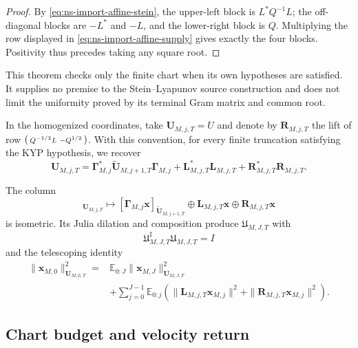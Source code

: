 \begin{proof}
By \eqref{eq:ns-import-affine-stein}, the upper-left block is \(L^*Q^{-1}L\); the off-diagonal blocks are \(-L^*\) and \(-L\), and the lower-right block is \(Q\). Multiplying the row displayed in \eqref{eq:ns-import-affine-supply} gives exactly the four blocks. Positivity thus precedes taking any square root.
\end{proof}

This theorem checks only the finite chart when its own hypotheses are satisfied. It supplies no premise to the Stein--Lyapunov source construction and does not limit the uniformity proved by its terminal Gram matrix and common root.

In the homogenized coordinates, take \(\mathbf U_{M,j,T}=U\) and denote by \(\mathbf R_{M,j,T}\) the lift of row \(\begin{psmallmatrix}Q^{-1/2}L&-Q^{1/2}\end{psmallmatrix}\).
With this convention, for every finite truncation satisfying the KYP hypothesis, we recover
\[
 \mathbf U_{M,j,T}
 =\mathbf\Gamma_{M,j}^*\widetilde{\mathbf U}_{M,j+1,T}
  \mathbf\Gamma_{M,j}
 +\mathbf L_{M,j,T}^*\mathbf L_{M,j,T}
 +\mathbf R_{M,j,T}^*\mathbf R_{M,j,T}.
\]

The column
\begin{equation}
 [\mathbf x]_{\mathbf U_{M,j,T}}
 \longmapsto
 [\mathbf\Gamma_{M,j}\mathbf x]_{
  \widetilde{\mathbf U}_{M,j+1,T}}
 \oplus\mathbf L_{M,j,T}\mathbf x
 \oplus\mathbf R_{M,j,T}\mathbf x
 \label{eq:ns-import-local-isometry}
\end{equation}
is isometric. Its Julia dilation and composition produce \(\mathfrak U_{M,J,T}\) with
\begin{equation}
 \mathfrak U_{M,J,T}^{\sharp}\mathfrak U_{M,J,T}=I
 \label{eq:ns-import-cascade-isometry}
\end{equation}
and the telescoping identity
\begin{equation}
 \begin{aligned}
 \|\mathbf x_{M,0}\|_{\mathbf U_{M,0,T}}^2
 ={}&\mathbb E_{0:J}
 \|\mathbf x_{M,J}\|_{\mathbf U_{M,J,T}}^2\\
 &+\sum_{j=0}^{J-1}\mathbb E_{0:j}
 \left(\|\mathbf L_{M,j,T}\mathbf x_{M,j}\|^2
       +\|\mathbf R_{M,j,T}\mathbf x_{M,j}\|^2\right).
 \end{aligned}
 \label{eq:ns-import-stein-telescope}
\end{equation}

\subsection{Chart budget and velocity return}

